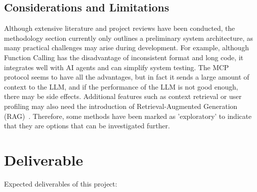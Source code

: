 \documentclass[project-plan]{report-template}
\begin{document}
\subsection{Considerations and Limitations}
Although extensive literature and project reviews have been conducted, the methodology section currently only outlines a preliminary system architecture, as many practical challenges may arise during development. For example, although Function Calling has the disadvantage of inconsistent format and long code, it integrates well with AI agents and can simplify system testing. The MCP protocol seems to have all the advantages, but in fact it sends a large amount of context to the LLM, and if the performance of the LLM is not good enough, there may be side effects. Additional features such as context retrieval or user profiling may also need the introduction of Retrieval-Augmented Generation (RAG)~\cite{GaoYunfan2023}. Therefore, some methods have been marked as 'exploratory' to indicate that they are options that can be investigated further.

\newpage
\section{Deliverable}
Expected deliverables of this project:
	
\end{document}
